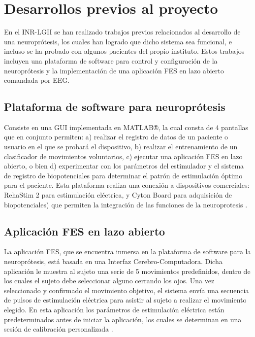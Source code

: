 \section{Desarrollos previos al proyecto}
En el INR-LGII se han realizado trabajos previos relacionados al desarrollo de una neuroprótesis, los cuales han logrado que dicho sistema sea funcional, e incluso se ha probado con algunos pacientes del propio instituto. Estos trabajos incluyen una plataforma de software para control y configuración de la neuroprótesis \cite{Fuentes2018}\cite{JanethFuentes2018} y la implementación de una aplicación FES en lazo abierto comandada por EEG\cite{Castillo2019}\cite{OmarCastillo2019}.

\subsection{Plataforma de software para neuroprótesis}
Consiste en una GUI implementada en MATLAB®, la cual consta de 4 pantallas que en conjunto permiten: a) realizar el registro de datos de un paciente o usuario en el que se probará el dispositivo, b) realizar el entrenamiento de un clasificador de movimientos voluntarios, c) ejecutar una aplicación FES en lazo abierto, o bien d) experimentar con los parámetros del estimulador y el sistema de registro de biopotenciales para determinar el patrón de estimulación óptimo para el paciente. Esta plataforma realiza una conexión a dispositivos comerciales: RehaStim 2 para estimulación eléctrica, y Cyton Board para adquisición de biopotenciales) que permiten la integración de las funciones de la neuroprotesis \cite{Fuentes2018}\cite{JanethFuentes2018}.

\subsection{Aplicación FES en lazo abierto}
La aplicación FES, que se encuentra inmersa en la plataforma de software para la neuroprótesis, está basada en una Interfaz Cerebro-Computadora. Dicha aplicación le muestra al sujeto una serie de 5 movimientos predefinidos, dentro de los cuales el sujeto debe seleccionar alguno cerrando los ojos. Una vez seleccionado y confirmado el movimiento objetivo, el sistema envía una secuencia de pulsos de estimulación eléctrica para asistir al sujeto a realizar el movimiento elegido. En esta aplicación los parámetros de estimulación eléctrica están predeterminados antes de iniciar la aplicación, los cuales se determinan en una sesión de calibración personalizada \cite{Castillo2019}\cite{OmarCastillo2019}.

